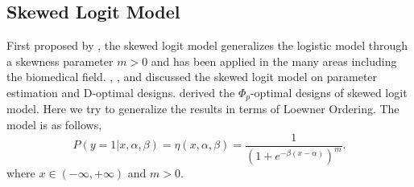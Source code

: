 \documentclass[12pt]{amsart}
\theoremstyle{definition}
\theoremstyle{remark}
\numberwithin{equation}{section}
\begin{document}
\subsection{Skewed Logit Model}\label{secskew}
First proposed by \cite{prentice1976}, the skewed logit model generalizes the logistic model through a skewness parameter $m>0$ and has been applied in the many areas including the biomedical field.   \cite{Gaudard1993}, \cite{nagler1994}, and \cite{hedayat1997} discussed the skewed logit model on parameter estimation and D-optimal designs. \cite{biedermann2006} derived the $\Phi_p$-optimal designs of skewed logit model. Here we try to generalize the results in terms of Loewner Ordering. The model is as follows,\[
P(y=1|x,\alpha,\beta) = \eta(x,\alpha,\beta)= \frac{1}{(1+e^{-\beta(x-\alpha)})^m}.
\]where $x\in (-\infty,+\infty)$ and $m>0$. 
\end{document}
